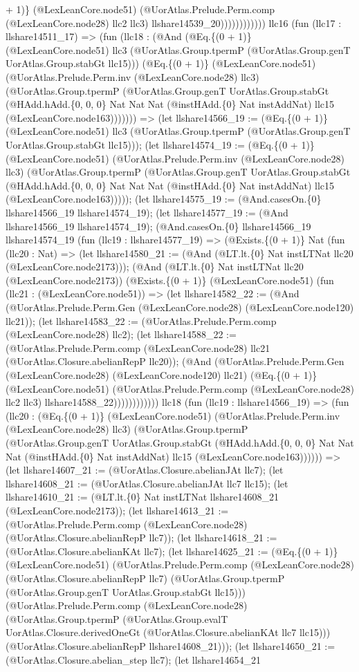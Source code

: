 \documentclass[11pt]{article}
\begin{document}
+ 1)\} (@LexLeanCore.node51) (@UorAtlas.Prelude.Perm.comp (@LexLeanCore.node28) llc2 llc3) llshare14539\_20)))))))))))) llc16 (fun (llc17 : llshare14511\_17) => (fun (llc18 : (@And (@Eq.\{(0 + 1)\} (@LexLeanCore.node51) llc3 (@UorAtlas.Group.tpermP (@UorAtlas.Group.genT UorAtlas.Group.stabGt llc15))) (@Eq.\{(0 + 1)\} (@LexLeanCore.node51) (@UorAtlas.Prelude.Perm.inv (@LexLeanCore.node28) llc3) (@UorAtlas.Group.tpermP (@UorAtlas.Group.genT UorAtlas.Group.stabGt (@HAdd.hAdd.\{0, 0, 0\} Nat Nat Nat (@instHAdd.\{0\} Nat instAddNat) llc15 (@LexLeanCore.node163))))))) => (let llshare14566\_19 := (@Eq.\{(0 + 1)\} (@LexLeanCore.node51) llc3 (@UorAtlas.Group.tpermP (@UorAtlas.Group.genT UorAtlas.Group.stabGt llc15))); (let llshare14574\_19 := (@Eq.\{(0 + 1)\} (@LexLeanCore.node51) (@UorAtlas.Prelude.Perm.inv (@LexLeanCore.node28) llc3) (@UorAtlas.Group.tpermP (@UorAtlas.Group.genT UorAtlas.Group.stabGt (@HAdd.hAdd.\{0, 0, 0\} Nat Nat Nat (@instHAdd.\{0\} Nat instAddNat) llc15 (@LexLeanCore.node163))))); (let llshare14575\_19 := (@And.casesOn.\{0\} llshare14566\_19 llshare14574\_19); (let llshare14577\_19 := (@And llshare14566\_19 llshare14574\_19); (@And.casesOn.\{0\} llshare14566\_19 llshare14574\_19 (fun (llc19 : llshare14577\_19) => (@Exists.\{(0 + 1)\} Nat (fun (llc20 : Nat) => (let llshare14580\_21 := (@And (@LT.lt.\{0\} Nat instLTNat llc20 (@LexLeanCore.node2173))); (@And (@LT.lt.\{0\} Nat instLTNat llc20 (@LexLeanCore.node2173)) (@Exists.\{(0 + 1)\} (@LexLeanCore.node51) (fun (llc21 : (@LexLeanCore.node51)) => (let llshare14582\_22 := (@And (@UorAtlas.Prelude.Perm.Gen (@LexLeanCore.node28) (@LexLeanCore.node120) llc21)); (let llshare14583\_22 := (@UorAtlas.Prelude.Perm.comp (@LexLeanCore.node28) llc2); (let llshare14588\_22 := (@UorAtlas.Prelude.Perm.comp (@LexLeanCore.node28) llc21 (@UorAtlas.Closure.abelianRepP llc20)); (@And (@UorAtlas.Prelude.Perm.Gen (@LexLeanCore.node28) (@LexLeanCore.node120) llc21) (@Eq.\{(0 + 1)\} (@LexLeanCore.node51) (@UorAtlas.Prelude.Perm.comp (@LexLeanCore.node28) llc2 llc3) llshare14588\_22)))))))))))) llc18 (fun (llc19 : llshare14566\_19) => (fun (llc20 : (@Eq.\{(0 + 1)\} (@LexLeanCore.node51) (@UorAtlas.Prelude.Perm.inv (@LexLeanCore.node28) llc3) (@UorAtlas.Group.tpermP (@UorAtlas.Group.genT UorAtlas.Group.stabGt (@HAdd.hAdd.\{0, 0, 0\} Nat Nat Nat (@instHAdd.\{0\} Nat instAddNat) llc15 (@LexLeanCore.node163)))))) => (let llshare14607\_21 := (@UorAtlas.Closure.abelianJAt llc7); (let llshare14608\_21 := (@UorAtlas.Closure.abelianJAt llc7 llc15); (let llshare14610\_21 := (@LT.lt.\{0\} Nat instLTNat llshare14608\_21 (@LexLeanCore.node2173)); (let llshare14613\_21 := (@UorAtlas.Prelude.Perm.comp (@LexLeanCore.node28) (@UorAtlas.Closure.abelianRepP llc7)); (let llshare14618\_21 := (@UorAtlas.Closure.abelianKAt llc7); (let llshare14625\_21 := (@Eq.\{(0 + 1)\} (@LexLeanCore.node51) (@UorAtlas.Prelude.Perm.comp (@LexLeanCore.node28) (@UorAtlas.Closure.abelianRepP llc7) (@UorAtlas.Group.tpermP (@UorAtlas.Group.genT UorAtlas.Group.stabGt llc15))) (@UorAtlas.Prelude.Perm.comp (@LexLeanCore.node28) (@UorAtlas.Group.tpermP (@UorAtlas.Group.evalT UorAtlas.Closure.derivedOneGt (@UorAtlas.Closure.abelianKAt llc7 llc15))) (@UorAtlas.Closure.abelianRepP llshare14608\_21))); (let llshare14650\_21 := (@UorAtlas.Closure.abelian\_step llc7); (let llshare14654\_21 
\end{document}

